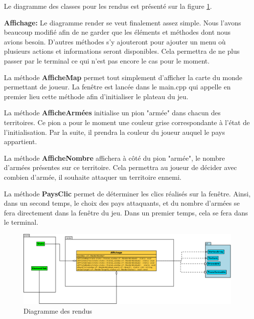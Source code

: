 Le diagramme des classes pour les rendus est présenté sur la figure \ref{fig:render}.
\newline

\textbf{Affichage:} Le diagramme render se veut finalement assez simple. Nous l'avons beaucoup modifié afin de ne garder que les éléments et méthodes dont nous avions besoin. 
D'autres méthodes s'y ajouteront pour ajouter un menu où plusieurs actions et informations seront disponibles. Cela permettra de ne plus passer par le terminal ce qui n'est pas encore le cas pour le moment. 
\newline 

La méthode \textbf{AfficheMap} permet tout simplement d'afficher la carte du monde permettant de joueur. La fenêtre est lancée dans le main.cpp qui appelle en premier lieu cette méthode afin d'initialiser le plateau du jeu. 
\newline 

La méthode \textbf{AfficheArmées} initialise un pion "armée" dans chacun des territoires. Ce pion a pour le moment une couleur grise correspondante à l'état de l'initialisation. Par la suite, il prendra la couleur du joueur auquel le pays appartient.  
\newline 

La méthode \textbf{AfficheNombre} affichera à côté du pion "armée", le nombre d'armées présentes sur ce territoire. Cela permettra au joueur de décider avec combien d'armée, il souhaite attaquer un territoire ennemi. 
\newline

La méthode \textbf{PaysClic} permet de déterminer les clics réalisés sur la fenêtre. Ainsi, dans un second temps, le choix des pays attaquants, et du nombre d'armées se fera directement dans la fenêtre du jeu. Dans un premier temps, cela se fera dans le terminal. 




\begin{landscape}
    \begin{figure}[!htbp]
        \centering
        \includegraphics[width=21cm]{Images/render.png}
        \caption{Diagramme des rendus}
        \label{fig:render}
    \end{figure}
\end{landscape}